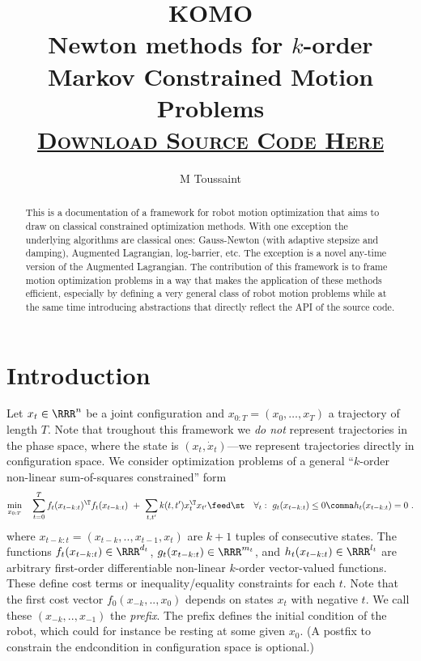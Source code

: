 \documentclass[10pt,fleqn,twoside]{article}
\title{{\Huge\textsf{KOMO}}\\
Newton methods for $k$-order Markov Constrained Motion Problems\\
\href{http://ipvs.informatik.uni-stuttgart.de/mlr/marc/source-code/14-KOMO.tgz}{\textbf{\textsc{\normalsize
Download Source Code Here}}}
}
\author{M Toussaint}
\begin{document}
\maketitle

\begin{abstract}
This is a documentation of a framework for robot motion optimization
that aims to draw on classical constrained optimization methods. With
one exception the underlying algorithms are classical ones:
Gauss-Newton (with adaptive stepsize and damping), Augmented
Lagrangian, log-barrier, etc. The exception is a novel any-time
version of the Augmented Lagrangian. The contribution of this
framework is to frame motion optimization problems in a way that makes
the application of these methods efficient, especially by defining a
very general class of robot motion problems while at the same time
introducing abstractions that directly reflect the API of the source
code.
\end{abstract}


\section{Introduction}

Let $x_t \in\RRR^n$ be a joint configuration and 
$x_{0:T} = (x_0,\ldots,x_T)$ a
trajectory of length $T$. Note that troughout this framework
we \emph{do not} represent trajectories in the phase space, where the
state is $(x_t, \dot x_t)$---we represent trajectories directly in
configuration space. We consider optimization problems of a general
``$k$-order non-linear sum-of-squares constrained'' form
\begin{align} \label{eqKOMO}
\min_{x_{0:T}}\quad&
\sum_{t=0}^{T} f_t(x_{t-k:t})^\T f_t(x_{t-k:t})
~+~ \sum_{t,t'} k(t,t') x_t^\T x_{t'} \feed
\st&
 \forall_t:~ g_t(x_{t-k:t}) \le 0\comma h_t(x_{t-k:t}) = 0 ~.
\end{align}
where $x_{t-k:t} = (x_{t-k},..,x_{t-1},x_t)$ are $k+1$ tuples of
consecutive states. The functions $f_t(x_{t-k:t}) \in \RRR^{d_t}$,
$g_t(x_{t-k:t})\in\RRR^{m_t}$, and $h_t(x_{t-k:t})\in\RRR^{l_t}$ are
arbitrary first-order differentiable non-linear $k$-order
vector-valued functions. These define cost terms or
inequality/equality constraints for each $t$.  Note that the first
cost vector $f_0(x_{-k},..,x_0)$ depends on states $x_t$ with negative
$t$. We call these $(x_{-k},..,x_{-1})$ the \emph{prefix}. The prefix
defines the initial condition of the robot, which could for instance
be resting at some given $x_0$. (A postfix to constrain the
endcondition in configuration space is optional.)
\end{document}
